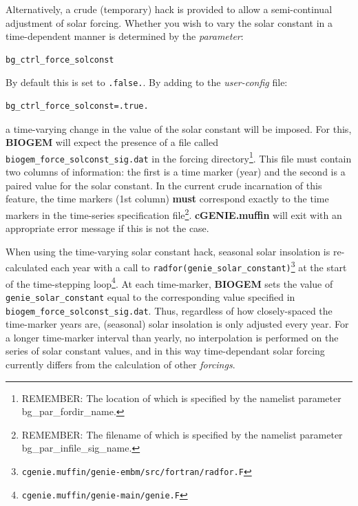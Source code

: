 \documentclass[11pt,fleqn]{book} %
\begin{document}
Alternatively, a crude (temporary) hack is provided to allow a semi-continual adjustment of solar forcing. Whether you wish to vary the solar constant in a time-dependent manner is determined by the \textit{parameter}:
\vspace{-2pt}\begin{verbatim}
bg_ctrl_force_solconst
\end{verbatim}\vspace{-2pt}
By default this is set to \texttt{.false.}. By adding to the \textit{user-config} file:
\vspace{-2pt}\begin{verbatim}
bg_ctrl_force_solconst=.true.
\end{verbatim}\vspace{-2pt}
a time-varying change in the value of the solar constant will be imposed. For this, \textbf{BIOGEM} will expect the presence of a file called \texttt{biogem\_force\_solconst\_sig.dat} in the forcing directory\footnote{REMEMBER: The location of which is specified by the namelist parameter bg\_par\_fordir\_name.}. This file must contain two columns of information: the first is a time marker (year) and the second is a paired value for the solar constant. In the current crude incarnation of this feature, the time markers (1st column) \textbf{must} correspond exactly to the time markers in the time-series specification file\footnote{REMEMBER: The filename of which is specified by the namelist parameter bg\_par\_infile\_sig\_name.}. \textbf{cGENIE.muffin} will exit with an appropriate error message if this is not the case.

When using the time-varying solar constant hack, seasonal solar insolation is re-calculated each year with a call to 
\texttt{radfor(genie\_solar\_constant)}\footnote{\texttt{cgenie.muffin/genie-embm/src/fortran/radfor.F}}
 at the start of the time-stepping loop\footnote{\texttt{cgenie.muffin/genie-main/genie.F}}. At each time-marker, \textbf{BIOGEM} sets the value of \texttt{genie\_solar\_constant} equal to the corresponding value specified in
\texttt{biogem\_force\_solconst\_sig.dat}. Thus, regardless of how closely-spaced the time-marker years are, (seasonal) solar insolation is only adjusted every year. For a longer time-marker interval than yearly, no interpolation is performed on the series of solar constant values, and in this way time-dependant solar forcing currently differs from the calculation of other \textit{forcings}.
\end{document}
